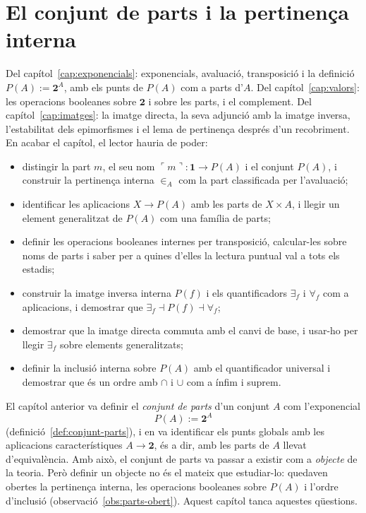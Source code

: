 \chapter{El conjunt de parts i la pertinença interna}\label{cap:parts-interna}

\begin{objectius}
 Del capítol~\ref{cap:exponencials}: exponencials, avaluació, transposició i la definició \(P(A):=\mathbf2^A\), amb els punts de \(P(A)\) com a parts d'\(A\). Del capítol~\ref{cap:valors}: les operacions booleanes sobre \(\mathbf2\) i sobre les parts, i el complement. Del capítol~\ref{cap:imatges}: la imatge directa, la seva adjunció amb la imatge inversa, l'estabilitat dels epimorfismes i el lema de pertinença després d'un recobriment.
 En acabar el capítol, el lector hauria de poder:
\begin{itemize}
  \item distingir la part \(m\), el seu nom \(\ulcorner m\urcorner\colon\mathbf1\to P(A)\) i el conjunt \(P(A)\), i construir la pertinença interna \(\in_A\) com la part classificada per l'avaluació;
  \item identificar les aplicacions \(X\to P(A)\) amb les parts de \(X\times A\), i llegir un element generalitzat de \(P(A)\) com una família de parts;
  \item definir les operacions booleanes internes per transposició, calcular-les sobre noms de parts i saber per a quines d'elles la lectura puntual val a tots els estadis;
  \item construir la imatge inversa interna \(P(f)\) i els quantificadors \(\exists_f\) i \(\forall_f\) com a aplicacions, i demostrar que \(\exists_f\dashv P(f)\dashv\forall_f\);
  \item demostrar que la imatge directa commuta amb el canvi de base, i usar-ho per llegir \(\exists_f\) sobre elements generalitzats;
  \item definir la inclusió interna sobre \(P(A)\) amb el quantificador universal i demostrar que és un ordre amb \(\cap\) i \(\cup\) com a ínfim i suprem.
\end{itemize}
\end{objectius}

El capítol anterior va definir el \emph{conjunt de parts} d'un conjunt
\(A\) com l'exponencial
\[
P(A):=\mathbf2^{A}
\]
(definició~\ref{def:conjunt-parts}), i en va identificar els punts globals
amb les aplicacions característiques \(A\to\mathbf2\), és a dir, amb les
parts de \(A\) llevat d'equivalència. Amb això, el conjunt de parts va
passar a existir com a \emph{objecte} de la teoria. Però definir un
objecte no és el mateix que estudiar-lo: quedaven obertes la pertinença
interna, les operacions booleanes sobre \(P(A)\) i l'ordre d'inclusió
(observació~\ref{obs:parts-obert}). Aquest capítol tanca aquestes
qüestions.


